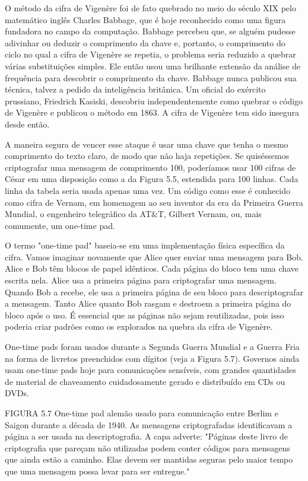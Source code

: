 \documentclass{book}
\begin{document}
O método da cifra de Vigenère foi de fato quebrado no meio do século XIX pelo matemático inglês Charles Babbage, que é hoje reconhecido como uma figura fundadora no campo da computação. Babbage percebeu que, se alguém pudesse adivinhar ou deduzir o comprimento da chave e, portanto, o comprimento do ciclo no qual a cifra de Vigenère se repetia, o problema seria reduzido a quebrar várias substituições simples. Ele então usou uma brilhante extensão da análise de frequência para descobrir o comprimento da chave. Babbage nunca publicou sua técnica, talvez a pedido da inteligência britânica. Um oficial do exército prussiano, Friedrich Kasiski, descobriu independentemente como quebrar o código de Vigenère e publicou o método em 1863. A cifra de Vigenère tem sido insegura desde então.

A maneira segura de vencer esse ataque é usar uma chave que tenha o mesmo comprimento do texto claro, de modo que não haja repetições. Se quiséssemos criptografar uma mensagem de comprimento 100, poderíamos usar 100 cifras de César em uma disposição como a da Figura 5.5, estendida para 100 linhas. Cada linha da tabela seria usada apenas uma vez. Um código como esse é conhecido como cifra de Vernam, em homenagem ao seu inventor da era da Primeira Guerra Mundial, o engenheiro telegráfico da AT\&T, Gilbert Vernam, ou, mais comumente, um one-time pad.

O termo "one-time pad" baseia-se em uma implementação física específica da cifra. Vamos imaginar novamente que Alice quer enviar uma mensagem para Bob. Alice e Bob têm blocos de papel idênticos. Cada página do bloco tem uma chave escrita nela. Alice usa a primeira página para criptografar uma mensagem. Quando Bob a recebe, ele usa a primeira página de seu bloco para descriptografar a mensagem. Tanto Alice quanto Bob rasgam e destroem a primeira página do bloco após o uso. É essencial que as páginas não sejam reutilizadas, pois isso poderia criar padrões como os explorados na quebra da cifra de Vigenère.

One-time pads foram usados durante a Segunda Guerra Mundial e a Guerra Fria na forma de livretos preenchidos com dígitos (veja a Figura 5.7). Governos ainda usam one-time pads hoje para comunicações sensíveis, com grandes quantidades de material de chaveamento cuidadosamente gerado e distribuído em CDs ou DVDs.

FIGURA 5.7 One-time pad alemão usado para comunicação entre Berlim e Saigon durante a década de 1940. As mensagens criptografadas identificavam a página a ser usada na descriptografia. A capa adverte: "Páginas deste livro de criptografia que pareçam não utilizadas podem conter códigos para mensagens que ainda estão a caminho. Elas devem ser mantidas seguras pelo maior tempo que uma mensagem possa levar para ser entregue."
\end{document}
